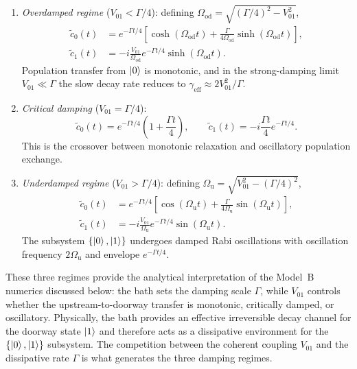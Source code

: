 \documentclass[aps,prx,reprint,showpacs,showkeys,floatfix]{revtex4-2}
\begin{document}
\begin{enumerate}
    \item \emph{Overdamped regime} ($V_{01}<\Gamma/4$):
    defining $\Omega_{\mathrm{od}} =
    \sqrt{(\Gamma/4)^2 - V_{01}^2}$,
    \begin{align}
        \tilde{c}_0(t) &=
        e^{-\Gamma t/4}
        \left[
            \cosh(\Omega_{\mathrm{od}} t)
            + \frac{\Gamma}{4\Omega_{\mathrm{od}}}
              \sinh(\Omega_{\mathrm{od}} t)
        \right], \\
        \tilde{c}_1(t) &=
        -i\frac{V_{01}}{\Omega_{\mathrm{od}}}
        e^{-\Gamma t/4}\sinh(\Omega_{\mathrm{od}} t).
    \end{align}
    Population transfer from $\ket{0}$ is monotonic, and in the strong-damping
    limit $V_{01}\ll\Gamma$ the slow decay rate reduces to
    $\gamma_{\mathrm{eff}}\approx 2V_{01}^2/\Gamma$.

    \item \emph{Critical damping} ($V_{01}=\Gamma/4$):
    \begin{equation}
        \tilde{c}_0(t) = e^{-\Gamma t/4}\left(1+\frac{\Gamma t}{4}\right),
        \qquad
        \tilde{c}_1(t) = -i\frac{\Gamma t}{4}e^{-\Gamma t/4}.
    \end{equation}
    This is the crossover between monotonic relaxation and oscillatory
    population exchange.

    \item \emph{Underdamped regime} ($V_{01}>\Gamma/4$):
    defining $\Omega_{\mathrm{u}} =
    \sqrt{V_{01}^2 - (\Gamma/4)^2}$,
    \begin{align}
        \tilde{c}_0(t) &=
        e^{-\Gamma t/4}
        \left[
            \cos(\Omega_{\mathrm{u}} t)
            + \frac{\Gamma}{4\Omega_{\mathrm{u}}}
              \sin(\Omega_{\mathrm{u}} t)
        \right], \\
        \tilde{c}_1(t) &=
        -i\frac{V_{01}}{\Omega_{\mathrm{u}}}
        e^{-\Gamma t/4}\sin(\Omega_{\mathrm{u}} t).
    \end{align}
    The subsystem $\{\ket{0},\ket{1}\}$ undergoes damped Rabi oscillations
    with oscillation frequency $2\Omega_{\mathrm{u}}$ and envelope
    $e^{-\Gamma t/4}$.
\end{enumerate}
These three regimes provide the analytical interpretation of the Model~B
numerics discussed below: the bath sets the damping scale $\Gamma$, while
$V_{01}$ controls whether the upstream-to-doorway transfer is monotonic,
critically damped, or oscillatory.  Physically, the bath provides an
effective irreversible decay channel for the doorway state $\ket{1}$ and
therefore acts as a dissipative environment for the $\{\ket{0},\ket{1}\}$
subsystem.  The competition between the coherent coupling $V_{01}$ and the
dissipative rate $\Gamma$ is what generates the three damping regimes.
\end{document}
